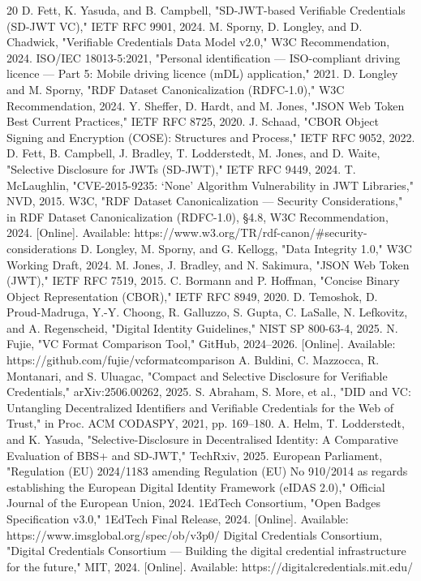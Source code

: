\documentclass[conference]{IEEEtran}
\begin{document}
\begin{thebibliography}{20}
 D. Fett, K. Yasuda, and B. Campbell, "SD-JWT-based Verifiable Credentials (SD-JWT VC)," IETF RFC 9901, 2024.
 M. Sporny, D. Longley, and D. Chadwick, "Verifiable Credentials Data Model v2.0," W3C Recommendation, 2024.
 ISO/IEC 18013-5:2021, "Personal identification --- ISO-compliant driving licence --- Part 5: Mobile driving licence (mDL) application," 2021.
 D. Longley and M. Sporny, "RDF Dataset Canonicalization (RDFC-1.0)," W3C Recommendation, 2024.
 Y. Sheffer, D. Hardt, and M. Jones, "JSON Web Token Best Current Practices," IETF RFC 8725, 2020.
 J. Schaad, "CBOR Object Signing and Encryption (COSE): Structures and Process," IETF RFC 9052, 2022.
 D. Fett, B. Campbell, J. Bradley, T. Lodderstedt, M. Jones, and D. Waite, "Selective Disclosure for JWTs (SD-JWT)," IETF RFC 9449, 2024.
 T. McLaughlin, "CVE-2015-9235: `None' Algorithm Vulnerability in JWT Libraries," NVD, 2015.
 W3C, "RDF Dataset Canonicalization --- Security Considerations," in RDF Dataset Canonicalization (RDFC-1.0), §4.8, W3C Recommendation, 2024. {[}Online{]}. Available: https://www.w3.org/TR/rdf-canon/\#security-considerations
 D. Longley, M. Sporny, and G. Kellogg, "Data Integrity 1.0," W3C Working Draft, 2024.
 M. Jones, J. Bradley, and N. Sakimura, "JSON Web Token (JWT)," IETF RFC 7519, 2015.
 C. Bormann and P. Hoffman, "Concise Binary Object Representation (CBOR)," IETF RFC 8949, 2020.
 D. Temoshok, D. Proud-Madruga, Y.-Y. Choong, R. Galluzzo, S. Gupta, C. LaSalle, N. Lefkovitz, and A. Regenscheid, "Digital Identity Guidelines," NIST SP 800-63-4, 2025.
 N. Fujie, "VC Format Comparison Tool," GitHub, 2024--2026. {[}Online{]}. Available: https://github.com/fujie/vcformatcomparison
 A. Buldini, C. Mazzocca, R. Montanari, and S. Uluagac, "Compact and Selective Disclosure for Verifiable Credentials," arXiv:2506.00262, 2025.
 S. Abraham, S. More, et al., "DID and VC: Untangling Decentralized Identifiers and Verifiable Credentials for the Web of Trust," in Proc. ACM CODASPY, 2021, pp. 169--180.
 A. Helm, T. Lodderstedt, and K. Yasuda, "Selective-Disclosure in Decentralised Identity: A Comparative Evaluation of BBS+ and SD-JWT," TechRxiv, 2025.
 European Parliament, "Regulation (EU) 2024/1183 amending Regulation (EU) No 910/2014 as regards establishing the European Digital Identity Framework (eIDAS 2.0)," Official Journal of the European Union, 2024.
 1EdTech Consortium, "Open Badges Specification v3.0," 1EdTech Final Release, 2024. {[}Online{]}. Available: https://www.imsglobal.org/spec/ob/v3p0/
 Digital Credentials Consortium, "Digital Credentials Consortium --- Building the digital credential infrastructure for the future," MIT, 2024. {[}Online{]}. Available: https://digitalcredentials.mit.edu/
\end{thebibliography}
\end{document}
